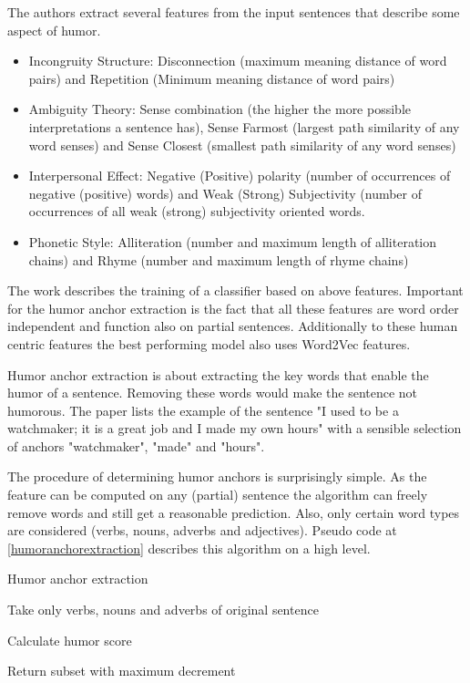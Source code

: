 \documentclass[draft,final,oneside]{vutinfth} %
\begin{document}
The authors extract several features from the input sentences that describe some aspect of humor.

\begin{itemize}
\item Incongruity Structure: Disconnection (maximum meaning distance of word pairs) and Repetition (Minimum meaning distance of word pairs)
\item Ambiguity Theory: Sense combination (the higher the more possible interpretations a sentence has), Sense Farmost (largest path similarity of any word senses) and Sense Closest (smallest path similarity of any word senses)
\item Interpersonal Effect: Negative (Positive) polarity (number of occurrences of negative (positive) words) and Weak (Strong) Subjectivity (number of occurrences of all weak (strong) subjectivity oriented words.
\item Phonetic Style: Alliteration (number and maximum length of alliteration chains) and Rhyme (number and maximum length of rhyme chains)
\end{itemize}

The work describes the training of a classifier based on above features. Important for the humor anchor extraction is the fact that all these features are word order independent and function also on partial sentences. Additionally to these human centric features the best performing model also uses Word2Vec features.

Humor anchor extraction is about extracting the key words that enable the humor of a sentence. Removing these words would make the sentence not humorous. The paper lists the example of the sentence "I used to be a watchmaker; it is a great job and I made my own hours" with a sensible selection of anchors "watchmaker", "made" and "hours".

The procedure of determining humor anchors is surprisingly simple. As the feature can be computed on any (partial) sentence the algorithm can freely remove words and still get a reasonable prediction. Also, only certain word types are considered (verbs, nouns, adverbs and adjectives). Pseudo code at \ref{humoranchorextraction} describes this algorithm on a high level.

\begin{algorithm}
\caption{Humor anchor extraction}\label{humoranchorextraction}

Take only verbs, nouns and adverbs of original sentence

Calculate humor score


Return subset with maximum decrement

\end{algorithm}
\end{document}
